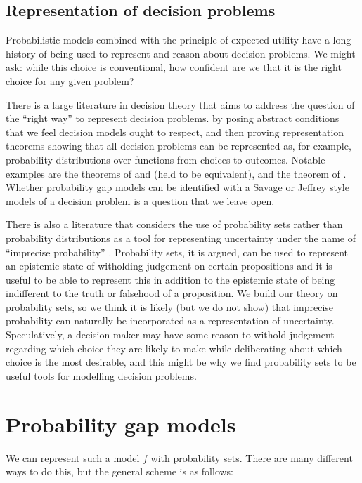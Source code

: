 \subsection{Representation of decision problems}

Probabilistic models combined with the principle of expected utility have a long history of being used to represent and reason about decision problems. We might ask: while this choice is conventional, how confident are we that it is the right choice for any given problem?

There is a large literature in decision theory that aims to address the question of the ``right way'' to represent decision problems. by posing abstract conditions that we feel decision models ought to respect, and then proving representation theorems showing that all decision problems can be represented as, for example, probability distributions over functions from choices to outcomes. Notable examples are the theorems of \citet{ramsey_truth_2016} and \citet{savage_foundations_1954} (held to be equivalent), and the theorem of \citet{bolker_functions_1966,jeffrey_logic_1990}. Whether probability gap models can be identified with a Savage or Jeffrey style models of a decision problem is a question that we leave open.

There is also a literature that considers the use of probability sets rather than probability distributions as a tool for representing uncertainty under the name of ``imprecise probability'' \citet{bradley_imprecise_2019,walley_statistical_1991}. Probability sets, it is argued, can be used to represent an epistemic state of witholding judgement on certain propositions and it is useful to be able to represent this in addition to the epistemic state of being indifferent to the truth or falsehood of a proposition. We build our theory on probability sets, so we think it is likely (but we do not show) that imprecise probability can naturally be incorporated as a representation of uncertainty. Speculatively, a decision maker may have some reason to withold judgement regarding which choice they are likely to make while deliberating about which choice is the most desirable, and this might be why we find probability sets to be useful tools for modelling decision problems.


\section{Probability gap models}

We can represent such a model $f$ with probability sets. There are many different ways to do this, but the general scheme is as follows:


